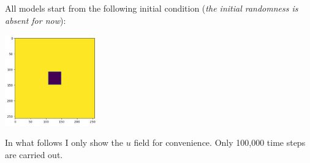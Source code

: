 All models start from the following initial condition ({\it the initial randomness is absent for now}):
\begin{center}
\includegraphics[width=4cm]{python_codes/fieldstone_171/pearson93/alpha_solution_0000000_u}
\end{center}

In what follows I only show the $u$ field for convenience.
Only 100,000 time steps are carried out.

